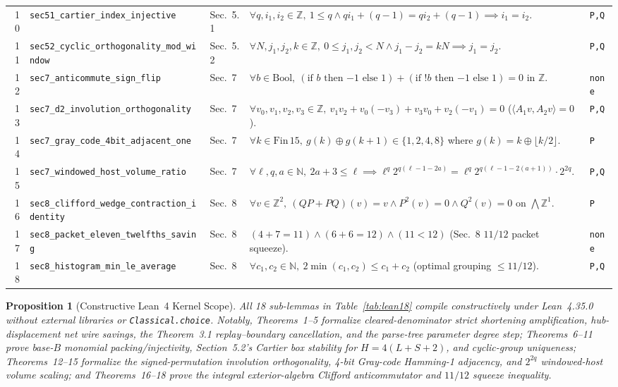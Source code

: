 \documentclass[10pt,twocolumn]{article}
\newtheorem{proposition}{Proposition}
\newcommand{\ZZ}{\mathbb{Z}}
\newcommand{\NN}{\mathbb{N}}
\begin{document}
\begin{table}[t]
\begin{tabular}{@{}r l l p{9.6cm} l@{}}
10 & \texttt{sec51\_cartier\_index\_injective} & Sec.~5.1 & $\forall q,i_1,i_2\in\ZZ,\ 1\le q \wedge q i_1 + (q-1) = q i_2 + (q-1) \implies i_1 = i_2$. & \texttt{P,Q} \\
11 & \texttt{sec52\_cyclic\_orthogonality\_mod\_window} & Sec.~5.2 & $\forall N,j_1,j_2,k\in\ZZ,\ 0\le j_1,j_2<N \wedge j_1 - j_2 = k N \implies j_1 = j_2$. & \texttt{P,Q} \\
12 & \texttt{sec7\_anticommute\_sign\_flip} & Sec.~7 & $\forall b\in\mathrm{Bool},\ (\text{if }b\text{ then }{-1}\text{ else }1)+(\text{if }!b\text{ then }{-1}\text{ else }1)=0$ in $\ZZ$. & \texttt{none} \\
13 & \texttt{sec7\_d2\_involution\_orthogonality} & Sec.~7 & $\forall v_0,v_1,v_2,v_3\in\ZZ,\ v_1 v_2 + v_0(-v_3) + v_3 v_0 + v_2(-v_1) = 0$ ($\langle A_1 v, A_2 v\rangle=0$). & \texttt{P,Q} \\
14 & \texttt{sec7\_gray\_code\_4bit\_adjacent\_one} & Sec.~7 & $\forall k\in\mathrm{Fin}\,15,\ g(k)\oplus g(k+1)\in\{1,2,4,8\}$ where $g(k)=k\oplus\lfloor k/2\rfloor$. & \texttt{P} \\
15 & \texttt{sec7\_windowed\_host\_volume\_ratio} & Sec.~7 & $\forall \ell,q,a\in\NN,\ 2a{+}3\le\ell \implies \ell^q 2^{q(\ell-1-2a)} = \ell^q 2^{q(\ell-1-2(a+1))}\cdot 2^{2q}$. & \texttt{P,Q} \\
16 & \texttt{sec8\_clifford\_wedge\_contraction\_identity} & Sec.~8 & $\forall v\in\ZZ^2,\ (QP+PQ)(v)=v \wedge P^2(v)=0 \wedge Q^2(v)=0$ on $\bigwedge\ZZ^1$. & \texttt{P} \\
17 & \texttt{sec8\_packet\_eleven\_twelfths\_saving} & Sec.~8 & $(4+7=11) \wedge (6+6=12) \wedge (11<12)$ (Sec.~8 $11/12$ packet squeeze). & \texttt{none} \\
18 & \texttt{sec8\_histogram\_min\_le\_average} & Sec.~8 & $\forall c_1,c_2\in\NN,\ 2\min(c_1,c_2) \le c_1 + c_2$ (optimal grouping $\le 11/12$). & \texttt{P,Q} \\
\bottomrule
\end{tabular}
\end{table}

\begin{proposition}[Constructive Lean~4 Kernel Scope]\label{prop:lean}
\normalfont All 18 sub-lemmas in Table~\ref{tab:lean18} compile constructively under Lean~4.35.0 without external libraries or \texttt{Classical.choice}. Notably, Theorems~1--5 formalize cleared-denominator strict shortening amplification, hub-displacement net wire savings, the Theorem~3.1 replay--boundary cancellation, and the parse-tree parameter degree step; Theorems~6--11 prove base-$B$ monomial packing/injectivity, Section~5.2's Cartier box stability for $H=4(L+S+2)$, and cyclic-group uniqueness; Theorems~12--15 formalize the signed-permutation involution orthogonality, 4-bit Gray-code Hamming-1 adjacency, and $2^{2q}$ windowed-host volume scaling; and Theorems~16--18 prove the integral exterior-algebra Clifford anticommutator and $11/12$ squeeze inequality.
\end{proposition}
\end{document}
